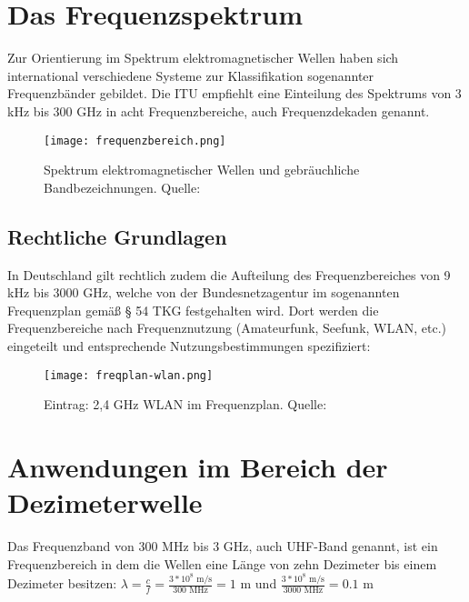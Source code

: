 \newpage
\section{Das Frequenzspektrum}
\label{section-frequenzbereiche}
Zur Orientierung im Spektrum elektromagnetischer Wellen haben sich international verschiedene Systeme zur Klassifikation sogenannter Frequenzbänder gebildet. Die \ac{ITU} empfiehlt eine Einteilung des Spektrums von 3 kHz bis 300 GHz in acht Frequenzbereiche, auch Frequenzdekaden genannt. \cite[vgl. ITU-R v.431-8]{itu-431:2015}

\begin{figure}[ht]
	\centering
	\texttt{[image: frequenzbereich.png]}
	\caption[Spektrum elektromagnetischer Wellen und gebräuchliche Bandbezeichnungen]{Spektrum elektromagnetischer Wellen und gebräuchliche Bandbezeichnungen. Quelle: \cite[Kark, S. 1]{Kark:2017}} 
	\label{frequenzbereiche}
\end{figure}






\subsection{Rechtliche Grundlagen} %
In Deutschland gilt rechtlich zudem die Aufteilung des Frequenzbereiches von 9 kHz bis 3000 GHz, welche von der Bundesnetzagentur im sogenannten Frequenzplan \cite[Bundesnetzagentur, 2016]{bundesnetzagentur-frequenzplan:2016} gemäß § 54 TKG festgehalten wird.
Dort werden die Frequenzbereiche nach Frequenznutzung (Amateurfunk, Seefunk, WLAN, etc.) eingeteilt und entsprechende Nutzungsbestimmungen spezifiziert:

\begin{figure}[ht]
	\centering
	\texttt{[image: freqplan-wlan.png]}
	\caption[Eintrag: 2,4 GHz WLAN im Frequenzplan]{Eintrag: 2,4 GHz WLAN im Frequenzplan. Quelle: \cite[Bundesnetzagentur, 2016]{bundesnetzagentur-frequenzplan:2016}}
	\label{frequenzplan-wlan}
\end{figure}







\section{Anwendungen im Bereich der Dezimeterwelle}
Das Frequenzband von 300 MHz bis 3 GHz, auch \ac{UHF}-Band genannt, ist ein Frequenzbereich in dem die Wellen eine Länge von zehn Dezimeter bis einem Dezimeter besitzen:
\( \lambda = \frac{c}{f} = \frac{3*10^8 \text{ m/s}}{300 \text{ MHz}} = 1\text{ m}\)
und
\( \frac{3*10^8 \text{ m/s}}{3000 \text{ MHz}} = 0.1\text{ m}\)






